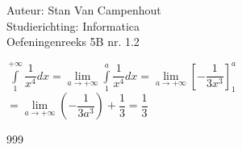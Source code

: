 \documentclass[a4paper]{article}
\begin{document}
  
\noindent \large Auteur: Stan Van Campenhout \\
\noindent \large Studierichting:  Informatica\\
\noindent \large Oefeningenreeks 5B nr. 1.2\\

\medskip

\normalsize

$ \displaystyle\int\limits_1^{+\infty}\dfrac{1}{x^4} dx = \lim\limits_{a\rightarrow+\infty} \displaystyle\int\limits_1^a\dfrac{1}{x^4} dx
= \lim\limits_{a\rightarrow+\infty}\left[-\dfrac{1}{3x^3}\right]_1^a $\\

$ = \lim\limits_{a\rightarrow+\infty}\left(-\dfrac{1}{3a^3}\right) + \dfrac{1}{3} = \dfrac{1}{3} $\\

\begin{thebibliography}{999}
\end{thebibliography}
\end{document}
